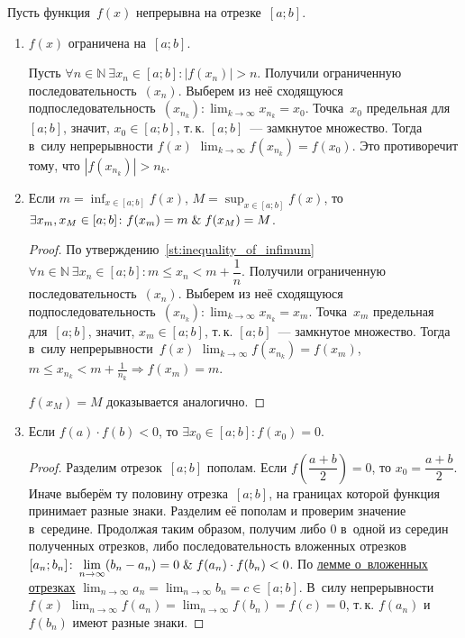 Пусть функция~$f(x)$ непрерывна на отрезке~$[a; b]$.
\begin{enumerate}
	\item $f(x)$ ограничена на~$[a; b]$.
	\begin{proofcontra}
	Пусть $\forall n \in \mathbb N \ \exists x_n \in [a; b] \colon |f(x_n)| > n$.
	Получили ограниченную последовательность~$(x_n)$.
	Выберем из неё сходящуюся подпоследовательность~$\displaystyle (x_{n_k}) \colon \lim_{k \to \infty} x_{n_k} = x_0$.
	Точка~$x_0$ предельная для~$[a; b]$, значит, $x_0 \in [a; b]$, т.\,к. $[a; b]$~--- замкнутое множество.
	Тогда в~силу непрерывности $f(x)$ $\displaystyle \lim_{k \to \infty} f(x_{n_k}) = f(x_0)$.
	Это противоречит тому, что $|f(x_{n_k})| > n_k$.
	\end{proofcontra}
	
	\item\label{st:continuous_function_takes_inf_and_sup} Если $\displaystyle m = \inf_{x \in [a; b]} f(x)$, $\displaystyle M = \sup_{x \in [a; b]} f(x)$, то
	$\exists x_m, x_M \in [a; b] \colon f(x_m) = m \mathrel{\&} f(x_M) = M$.
	\begin{proof}
	По утверждению~\ref{st:inequality_of_infimum} $\forall n \in \mathbb N \ \exists x_n \in [a; b] \colon m \leqslant x_n < m + \dfrac1n$.
	Получили ограниченную последовательность~$(x_n)$.
	Выберем из неё сходящуюся подпоследовательность~$\displaystyle (x_{n_k}) \colon \lim_{k \to \infty} x_{n_k} = x_m$.
	Точка~$x_m$ предельная для~$[a; b]$, значит, $x_m \in [a; b]$, т.\,к. $[a; b]$~--- замкнутое множество.
	Тогда в~силу непрерывности~$f(x)$ $\displaystyle \lim_{k \to \infty} f(x_{n_k}) = f(x_m)$, $\displaystyle m \leqslant x_{n_k} < m + \frac1{n_k} \Rightarrow f(x_m) = m$.
	
	$f(x_M) = M$ доказывается аналогично.
	\end{proof}
	
	\item \begin{theorem}
	\label{th:zero_of_continuous_function}
	Если $f(a) \cdot f(b) < 0$, то $\exists x_0 \in [a; b] \colon f(x_0) = 0$.
	\end{theorem}
	\begin{proof}
	Разделим отрезок~$[a; b]$ пополам.
	Если $f\left( \dfrac{a + b}2 \right) = 0$, то $x_0 = \dfrac{a + b}2$.
	Иначе выберём ту половину отрезка~$[a; b]$, на границах которой функция принимает разные знаки.
	Разделим её пополам и проверим значение в~середине.
	Продолжая таким образом, получим либо $0$ в~одной из середин полученных отрезков, либо последовательность вложенных отрезков~$\displaystyle [a_n; b_n] \colon \lim_{n \to \infty} (b_n - a_n) = 0 \mathrel{\&} f(a_n) \cdot f(b_n) < 0$.
	По \hyperref[lemma:about_nested_intervals]{лемме о~вложенных отрезках} $\displaystyle \lim_{n \to \infty} a_n = \lim_{n \to \infty} b_n = c \in [a; b]$.
	В~силу непрерывности~$f(x)$ $\displaystyle \lim_{n \to \infty} f(a_n) = \lim_{n \to \infty} f(b_n) = f(c) = 0$, т.\,к. $f(a_n)$ и $f(b_n)$ имеют разные знаки.
	\end{proof}
	

\end{enumerate}
